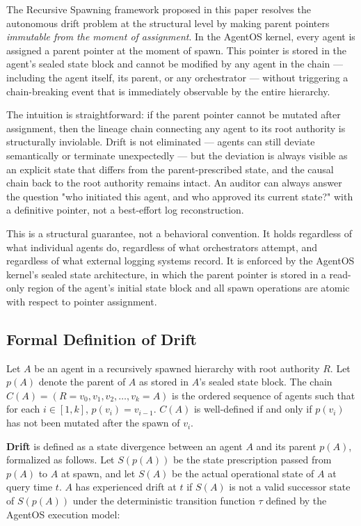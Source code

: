 The Recursive Spawning framework proposed in this paper resolves the autonomous drift problem at the structural level by making parent pointers \textit{immutable from the moment of assignment}. In the AgentOS kernel, every agent is assigned a parent pointer at the moment of spawn. This pointer is stored in the agent's sealed state block and cannot be modified by any agent in the chain — including the agent itself, its parent, or any orchestrator — without triggering a chain-breaking event that is immediately observable by the entire hierarchy.

The intuition is straightforward: if the parent pointer cannot be mutated after assignment, then the lineage chain connecting any agent to its root authority is structurally inviolable. Drift is not eliminated — agents can still deviate semantically or terminate unexpectedly — but the deviation is always visible as an explicit state that differs from the parent-prescribed state, and the causal chain back to the root authority remains intact. An auditor can always answer the question "who initiated this agent, and who approved its current state?" with a definitive pointer, not a best-effort log reconstruction.

This is a structural guarantee, not a behavioral convention. It holds regardless of what individual agents do, regardless of what orchestrators attempt, and regardless of what external logging systems record. It is enforced by the AgentOS kernel's sealed state architecture, in which the parent pointer is stored in a read-only region of the agent's initial state block and all spawn operations are atomic with respect to pointer assignment.

\subsection{Formal Definition of Drift}

Let $A$ be an agent in a recursively spawned hierarchy with root authority $R$. Let $p(A)$ denote the parent of $A$ as stored in $A$'s sealed state block. The chain $C(A) = (R = v_0, v_1, v_2, \dots, v_k = A)$ is the ordered sequence of agents such that for each $i \in [1, k]$, $p(v_i) = v_{i-1}$. $C(A)$ is well-defined if and only if $p(v_i)$ has not been mutated after the spawn of $v_i$.

\textbf{Drift} is defined as a state divergence between an agent $A$ and its parent $p(A)$, formalized as follows. Let $S(p(A))$ be the state prescription passed from $p(A)$ to $A$ at spawn, and let $S(A)$ be the actual operational state of $A$ at query time $t$. $A$ has experienced drift at $t$ if $S(A)$ is not a valid successor state of $S(p(A))$ under the deterministic transition function $\tau$ defined by the AgentOS execution model:


